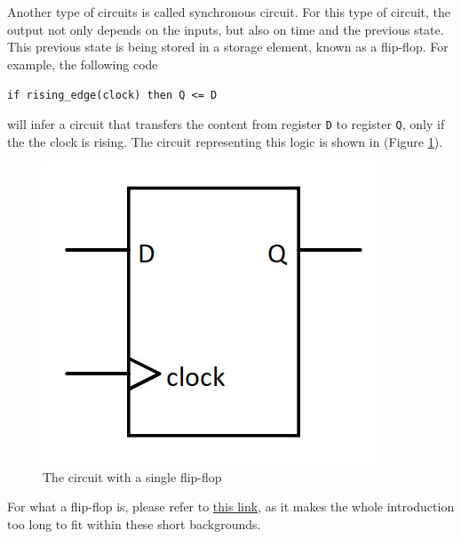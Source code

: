 \documentclass{article}
\newcommand{\aaa}[2]
	{\href{#1}{#2}}
\begin{document}
		Another type of circuits is called synchronous circuit. For this type of circuit, the output not only depends on the inputs, but also on time and the previous state. This previous state is being stored in a storage element, known as a flip-flop. For example, the following code \begin{displayquote}
			\texttt{if rising\_edge(clock) then Q <= D}
		\end{displayquote} will infer a circuit that transfers the content from register \texttt{D} to register \texttt{Q}, only if the the clock is rising. The circuit representing this logic is shown in (Figure \ref{fig:dff}).
	\begin{figure}[h]
		\centering
		\includegraphics[scale=0.35]{dff}
		\caption{The circuit with a single flip-flop}
		\label{fig:dff}
	\end{figure}For what a flip-flop is, please refer to \aaa{https://circuitdigest.com/electronic-circuits/d-flip-flops}{this link}, as it makes the whole introduction too long to fit within these short backgrounds.
	\\
		
\end{document}

